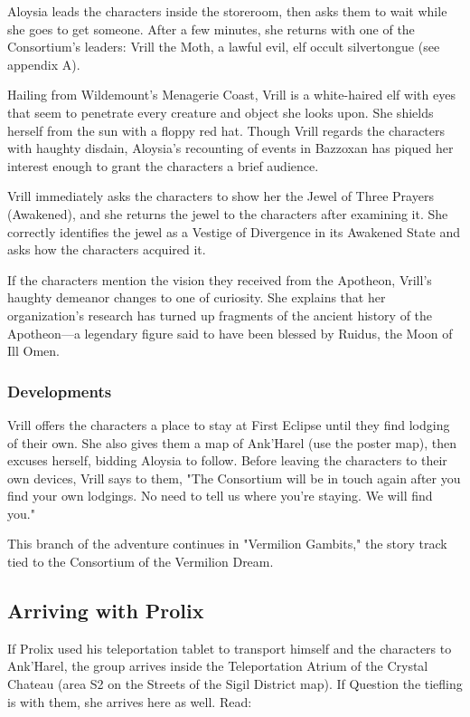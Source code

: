 \documentclass[10pt,a4paper,twoside,bg=print,twocolumn,openany,nodeprecatedcode]{dndbook}
\begin{document}
Aloysia leads the characters inside the storeroom, then asks them to wait while she goes to get someone. After a few minutes, she returns with one of the Consortium's leaders: Vrill the Moth, a lawful evil, elf occult silvertongue (see appendix A).

Hailing from Wildemount's Menagerie Coast, Vrill is a white-haired elf with eyes that seem to penetrate every creature and object she looks upon. She shields herself from the sun with a floppy red hat. Though Vrill regards the characters with haughty disdain, Aloysia's recounting of events in Bazzoxan has piqued her interest enough to grant the characters a brief audience.

Vrill immediately asks the characters to show her the Jewel of Three Prayers (Awakened), and she returns the jewel to the characters after examining it. She correctly identifies the jewel as a Vestige of Divergence in its Awakened State and asks how the characters acquired it.

If the characters mention the vision they received from the Apotheon, Vrill's haughty demeanor changes to one of curiosity. She explains that her organization's research has turned up fragments of the ancient history of the Apotheon—a legendary figure said to have been blessed by Ruidus, the Moon of Ill Omen.

\subsubsection{Developments}
Vrill offers the characters a place to stay at First Eclipse until they find lodging of their own. She also gives them a map of Ank'Harel (use the poster map), then excuses herself, bidding Aloysia to follow. Before leaving the characters to their own devices, Vrill says to them, "The Consortium will be in touch again after you find your own lodgings. No need to tell us where you're staying. We will find you."

This branch of the adventure continues in "Vermilion Gambits," the story track tied to the Consortium of the Vermilion Dream.

\subsection{Arriving with Prolix}
If Prolix used his teleportation tablet to transport himself and the characters to Ank'Harel, the group arrives inside the Teleportation Atrium of the Crystal Chateau (area S2 on the Streets of the Sigil District map). If Question the tiefling is with them, she arrives here as well. Read:
\end{document}
